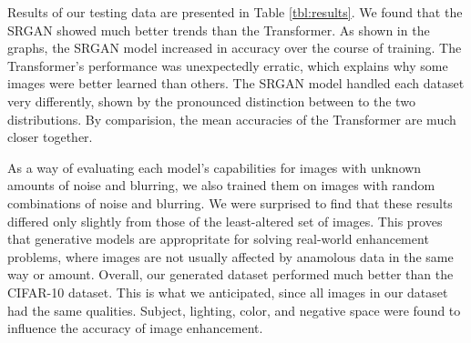 \documentclass[letterpaper]{article} %
\begin{document}
Results of our testing data are presented in Table \ref{tbl:results}.
We found that the SRGAN showed much better trends than the Transformer.
As shown in the graphs, the SRGAN model increased in accuracy over the course of training.
The Transformer's performance was unexpectedly erratic, which explains why some images were better learned than others.
The SRGAN model handled each dataset very differently,
shown by the pronounced distinction between to the two distributions.
By comparision, the mean accuracies of the Transformer are much closer together.

As a way of evaluating each model's capabilities for images with unknown amounts of
noise and blurring, we also trained them on images with random combinations of noise and blurring.
We were surprised to find that these results differed only slightly from
those of the least-altered set of images.
This proves that generative models are appropritate for solving real-world enhancement
problems, where images are not usually affected by anamolous data in the same way or amount.
Overall, our generated dataset performed much better than the CIFAR-10 dataset.
This is what we anticipated, since all images in our dataset had the same qualities.
Subject, lighting, color, and negative space were found to influence the accuracy of image enhancement.
\end{document}
